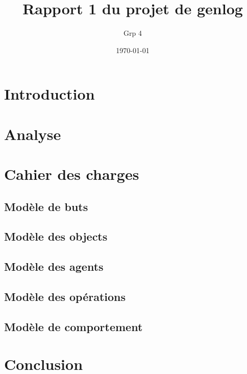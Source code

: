 \documentclass[12pt,openany]{book}
\title{Rapport 1 du projet de genlog}
\author{Grp 4}
\date{\today}
\begin{document}
\setlength{\parskip}{1em}

\maketitle

\chapter*{Introduction}
	

\chapter{Analyse}
	

\chapter{Cahier des charges}
	\section{Modèle de buts}
		

	\section{Modèle des objects}
		

	\section{Modèle des agents}
		

	\section{Modèle des opérations}
		

	\section{Modèle de comportement}
		

\chapter*{Conclusion}
	
\end{document}
